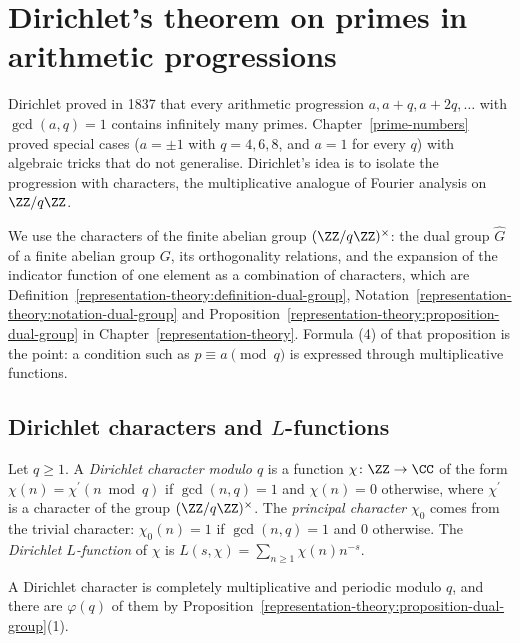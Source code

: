 \section{Dirichlet's theorem on primes in arithmetic progressions}\label{analytic-number-theory:section-dirichlet}

Dirichlet proved in 1837 that every arithmetic progression $a, a + q, a + 2q, \ldots$ with $\gcd(a, q) = 1$ contains infinitely many primes. Chapter~\ref{prime-numbers} proved special cases
($a = \pm1$ with $q = 4, 6, 8$, and $a = 1$ for every $q$) with algebraic tricks that do not generalise. Dirichlet's idea is to isolate the progression with characters, the multiplicative analogue of
Fourier analysis on $\ZZ/q\ZZ$.

We use the characters of the finite abelian group $(\ZZ/q\ZZ)^\times$: the dual group $\widehat G$ of a finite abelian group $G$, its orthogonality relations, and the expansion of the
indicator function of one element as a combination of characters, which are
Definition~\ref{representation-theory:definition-dual-group}, Notation~\ref{representation-theory:notation-dual-group} and
Proposition~\ref{representation-theory:proposition-dual-group} in Chapter~\ref{representation-theory}. Formula (4) of that proposition is the point: a condition such as
$p \equiv a \pmod q$ is expressed through multiplicative functions.

\subsection{Dirichlet characters and $L$-functions}\label{analytic-number-theory:subsection-l-functions}

\begin{definition}\label{analytic-number-theory:definition-dirichlet-character}
Let $q \geq 1$. A \emph{Dirichlet character modulo $q$} is a function $\chi \colon \ZZ \to \CC$ of the form $\chi(n) = \chi^{\prime}(n \bmod q)$ if $\gcd(n, q) = 1$ and $\chi(n) = 0$ otherwise, where
$\chi^{\prime}$ is a character of the group $(\ZZ/q\ZZ)^\times$. The \emph{principal character} $\chi_0$ comes from the trivial character: $\chi_0(n) = 1$ if $\gcd(n, q) = 1$ and $0$ otherwise. The
\emph{Dirichlet $L$-function} of $\chi$ is $L(s, \chi) = \sum_{n \geq 1}\chi(n)n^{-s}$.
\end{definition}

A Dirichlet character is completely multiplicative and periodic modulo $q$, and there are $\varphi(q)$ of them by Proposition~\ref{representation-theory:proposition-dual-group}(1).

